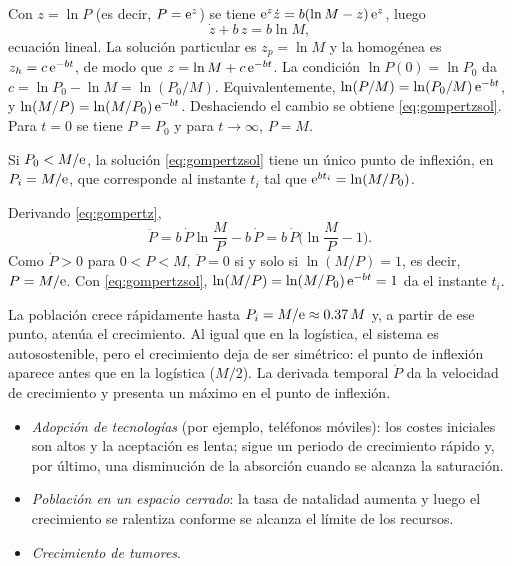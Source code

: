 \documentclass[11pt,twoside]{article}
\begin{document}
\begin{demostracion}
Con $z=\ln P$ (es decir, $P=\mathrm{e}^{z}$) se tiene $\mathrm{e}^{z}\dot z=b(\ln M-z)\,\mathrm{e}^{z}$, luego
\begin{equation*}
\dot z+b\,z=b\ln M,
\end{equation*}
ecuación lineal. La solución particular es $z_p=\ln M$ y la homogénea es $z_h=c\,\mathrm{e}^{-bt}$, de modo que
$z=\ln M+c\,\mathrm{e}^{-bt}$. La condición $\ln P(0)=\ln P_0$ da $c=\ln P_0-\ln M=\ln(P_0/M)$. Equivalentemente,
$\ln(P/M)=\ln(P_0/M)\,\mathrm{e}^{-bt}$, y $\ln(M/P)=\ln(M/P_0)\,\mathrm{e}^{-bt}$. Deshaciendo el cambio se obtiene \eqref{eq:gompertzsol}.
Para $t=0$ se tiene $P=P_0$ y para $t\to\infty$, $P=M$.
\end{demostracion}

\begin{lema}\label{lem:gompertz}
Si $P_0<M/\mathrm{e}$, la solución \eqref{eq:gompertzsol} tiene un único punto de inflexión, en $P_i=M/\mathrm{e}$, que corresponde al
instante $t_i$ tal que $\mathrm{e}^{bt_i}=\ln(M/P_0)$.
\end{lema}

\begin{demostracion}
Derivando \eqref{eq:gompertz},
\begin{equation*}
\ddot P=b\,\dot P\ln\frac MP-b\,\dot P=b\,\dot P\Big(\ln\frac MP-1\Big).
\end{equation*}
Como $\dot P>0$ para $0<P<M$, $\ddot P=0$ si y solo si $\ln(M/P)=1$, es decir, $P=M/\mathrm{e}$. Con \eqref{eq:gompertzsol},
$\ln(M/P)=\ln(M/P_0)\,\mathrm{e}^{-bt}=1$ da el instante $t_i$.
\end{demostracion}

La población crece rápidamente hasta $P_i=M/\mathrm{e}\approx0.37\,M$ y, a partir de ese punto, atenúa el crecimiento. Al igual
que en la logística, el sistema es autosostenible, pero el crecimiento deja de ser simétrico: el punto de inflexión aparece
antes que en la logística ($M/2$). La derivada temporal $\dot P$ da la velocidad de crecimiento y presenta un máximo en el
punto de inflexión.

\begin{observacion}
\begin{itemize}
\item \emph{Adopción de tecnologías} (por ejemplo, teléfonos móviles): los costes iniciales son altos y la aceptación es
lenta; sigue un periodo de crecimiento rápido y, por último, una disminución de la absorción cuando se alcanza la saturación.
\item \emph{Población en un espacio cerrado}: la tasa de natalidad aumenta y luego el crecimiento se ralentiza conforme se
alcanza el límite de los recursos.
\item \emph{Crecimiento de tumores}.
\end{itemize}
\end{observacion}
\end{document}
